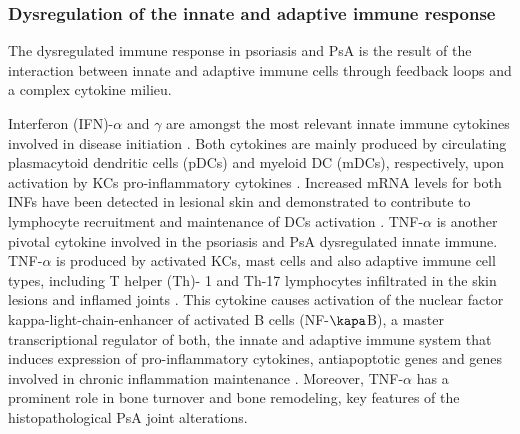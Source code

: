 \subsubsection*{Dysregulation of the innate and adaptive immune response}
The dysregulated immune response in psoriasis and PsA is the result of the interaction between innate and adaptive immune cells through feedback loops and a complex cytokine milieu. 

Interferon (IFN)-$\alpha$ and $\gamma$ are amongst the most relevant innate immune cytokines involved in disease initiation \parencite{Leanne2009}. Both cytokines are mainly produced by circulating plasmacytoid dendritic cells (pDCs) and myeloid DC (mDCs), respectively, upon activation by KCs pro-inflammatory cytokines \parencite{Perera2012}. Increased mRNA levels for both INFs have been detected in lesional skin and demonstrated to contribute to lymphocyte recruitment and maintenance of DCs activation \parencite{Schmid1994}. TNF-$\alpha$ is another pivotal cytokine involved in the psoriasis and PsA dysregulated innate immune. TNF-$\alpha$ is produced by activated KCs, mast cells and also adaptive immune cell types, including T helper (Th)- 1 and Th-17 lymphocytes infiltrated in the skin lesions and inflamed joints \parencite{Perera2012,Lizzul2005}. This cytokine causes activation of the nuclear factor kappa-light-chain-enhancer of activated B cells (NF-$\kapa$B), a master transcriptional regulator of both, the innate and adaptive immune system that induces expression of pro-inflammatory cytokines, antiapoptotic genes and genes involved in chronic inflammation maintenance \parencite{Lizzul2005, Johansen2010}. Moreover, TNF-$\alpha$ has a prominent role in bone turnover and bone remodeling, key features of the histopathological PsA joint alterations\parencite{Mensah2008}. 

